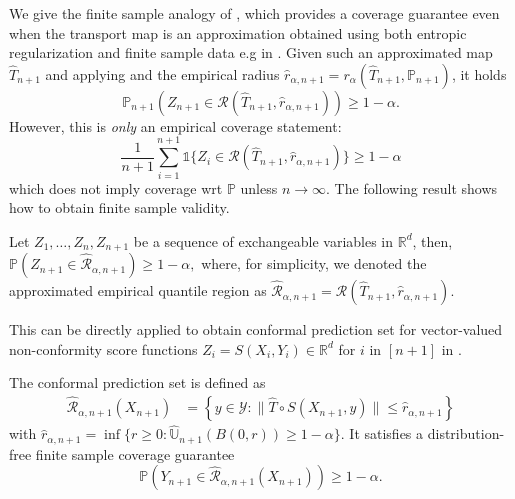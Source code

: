 We give the finite sample analogy of , which provides a coverage guarantee even when the transport map is an approximation obtained using both entropic regularization and finite sample data e.g in .\newline
Given such an approximated map $\hat T_{n+1}$ and applying
and the empirical radius $\hat r_{\alpha, n+1} = r_\alpha(\hat T_{n+1}, \mathbb{P}_{n+1})$, it holds
$$
\mathbb{P}_{n+1}(Z_{n+1} \in \mathcal{R}(\hat T_{n+1}, \hat r_{\alpha, n+1})) \geq 1-\alpha.
$$
However, this is \emph{only} an empirical coverage statement:
$$
\frac{1}{n+1}\sum_{i=1}^{n+1} \mathds{1}\{Z_i \in \mathcal{R}(\hat T_{n+1}, \hat r_{\alpha, n+1})\} \geq 1 - \alpha
$$
which does not imply coverage wrt $\mathbb{P}$ unless $n \to \infty$. The following result shows how to obtain finite sample validity.

\begin{lemma}\label{lm:coverage_empirical_measure}
Let $Z_1, \ldots, Z_n, Z_{n+1}$ be a sequence of exchangeable variables in $\mathbb{R}^d$, then,
$
   \mathbb{P}(Z_{n+1} \in \widehat {\mathcal{R}}_{\alpha, n+1}) \geq 1-\alpha,
$
where, for simplicity, we denoted the approximated empirical quantile region as $\widehat {\mathcal{R}}_{\alpha, n+1} = \mathcal{R}(\hat T_{n+1}, \hat r_{\alpha, n+1})$. 
\end{lemma}






This can be directly applied to obtain conformal prediction set for vector-valued non-conformity score functions 
$Z_i = S(X_i, Y_i) \in \mathbb{R}^d$ for $i$ in $[n+1]$ in .

\begin{proposition}\label{prop:Vector_PIT_Guarantee}
The conformal prediction set is defined as
\begin{align*}
\widehat{\mathcal{R}}_{\alpha, n+1}(X_{n+1}) &= \left\{y \in \mathcal{Y} : \|\hat T \circ S(X_{n+1}, y)\| \leq \hat{r}_{\alpha, n+1}\right\} 
\end{align*}
with  
$\hat{r}_{\alpha,n+1} = \inf\big\{r \geq 0: \hat{\mathbb{U}}_{n+1} (B(0, r)) \geq 1-\alpha\big\}$.
It satisfies a distribution-free finite sample coverage guarantee
\begin{equation}\label{eq:valid_empirical_radius}
\mathbb{P}\left(Y_{n+1} \in \widehat{\mathcal{R}}_{\alpha, n+1}(X_{n+1})\right) \geq 1 - \alpha.
\end{equation}
\end{proposition}

